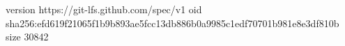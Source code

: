 version https://git-lfs.github.com/spec/v1
oid sha256:efd619f21065f1b9b893ae5fcc13db886b0a9985c1edf70701b981e8e3df810b
size 30842
